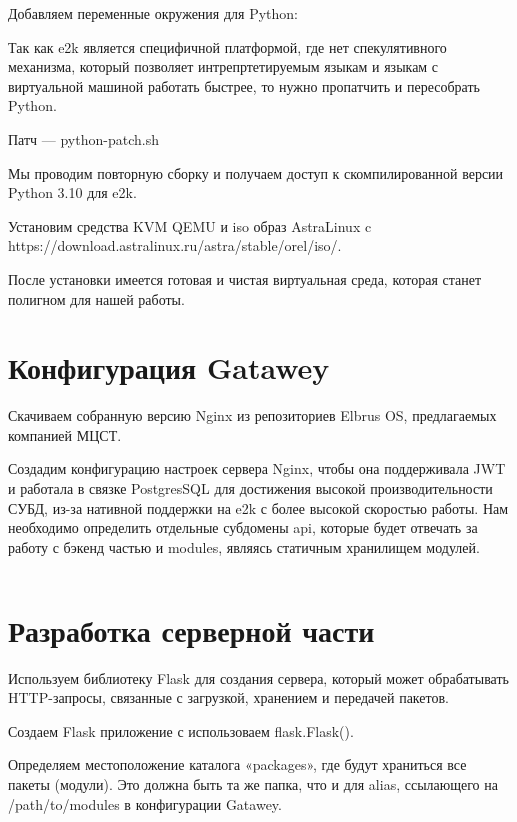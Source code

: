 Добавляем переменные окружения для Python:

\begin{listing}[H]
\end{listing}
\label{lst:c}


Так как e2k является специфичной платформой, где нет спекулятивного механизма, который позволяет интрепртетируемым языкам и языкам с виртуальной машиной работать быстрее, то нужно пропатчить и пересобрать Python.

\begin{listing}[H]
\caption{Патч — python-patch.sh} 
\end{listing}
\label{lst:c}

Мы проводим повторную сборку и получаем доступ к скомпилированной версии Python 3.10 для e2k.

Установим средства KVM QEMU и iso образ AstraLinux c https://download.astralinux.ru/astra/stable/orel/iso/.

После установки имеется готовая и чистая виртуальная среда, которая станет полигном для нашей работы. 

\section{Конфигурация Gatawey}

Скачиваем собранную версию Nginx из репозиториев Elbrus OS, предлагаемых компанией МЦСТ.

Создадим конфигурацию настроек сервера Nginx, чтобы она поддерживала JWT и работала в связке PostgresSQL для достижения высокой производительности СУБД, из-за нативной поддержки на e2k с более высокой скоростью работы. Нам необходимо определить отдельные субдомены api, которые будет отвечать за работу с бэкенд частью и modules, являясь статичным хранилищем модулей.


\inputminted[fontsize=\small]{text}{../src/nginx}

\section{Разработка серверной части}

Используем библиотеку Flask для создания сервера, который может обрабатывать HTTP-запросы, связанные с загрузкой, хранением и передачей пакетов.

Создаем Flask приложение с использоваем flask.Flask(). 

Определяем местоположение каталога «packages», где будут храниться все пакеты (модули). Это должна быть та же папка, что и для alias, ссылающего на /path/to/modules в конфигурации Gatawey. 

